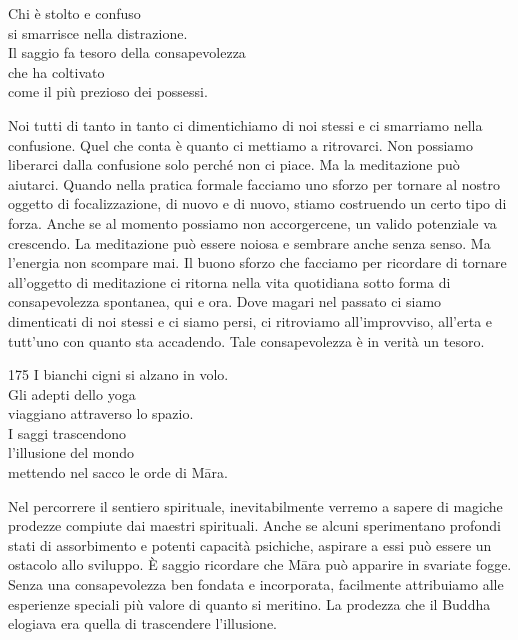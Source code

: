 
\begin{dhpVerse}{26}
\label{dhp-26}
Chi \`{e} stolto e confuso\\
si smarrisce nella distrazione.\\
Il saggio fa tesoro della consapevolezza\\
che ha coltivato\\
come il più prezioso dei possessi.
\end{dhpVerse}

\begin{dhpRefl}
Noi tutti di tanto in tanto ci dimentichiamo di noi stessi e ci smarriamo nella confusione. Quel che conta \`{e} quanto ci mettiamo a ritrovarci. Non possiamo liberarci dalla confusione solo perch\'{e} non ci piace. Ma la meditazione pu\`{o} aiutarci. Quando nella pratica formale facciamo uno sforzo per tornare al nostro oggetto di focalizzazione, di nuovo e di nuovo, stiamo costruendo un certo tipo di forza. Anche se al momento possiamo non accorgercene, un valido potenziale va crescendo. La meditazione pu\`{o} essere noiosa e sembrare anche senza senso. Ma l'energia non scompare mai. Il buono sforzo che facciamo per ricordare di tornare all'oggetto di meditazione ci ritorna nella vita quotidiana sotto forma di consapevolezza spontanea, qui e ora. Dove magari nel passato ci siamo dimenticati di noi stessi e ci siamo persi, ci ritroviamo all'improvviso, all'erta e tutt'uno con quanto sta accadendo. Tale consapevolezza \`{e} in verit\`{a} un tesoro.
\end{dhpRefl}


\begin{dhpVerse}{175}
\label{dhp-175}
I bianchi cigni si alzano in volo.\\
Gli adepti dello yoga\\
viaggiano attraverso lo spazio.\\
I saggi trascendono\\
l'illusione del mondo\\
mettendo nel sacco le orde di Māra.
\end{dhpVerse}

\begin{dhpRefl}
Nel percorrere il sentiero spirituale, inevitabilmente verremo a sapere di magiche prodezze compiute dai maestri spirituali. Anche se alcuni sperimentano profondi stati di assorbimento e potenti capacit\`{a} psichiche, aspirare a essi pu\`{o} essere un ostacolo allo sviluppo. \`{E} saggio ricordare che Māra pu\`{o} apparire in svariate fogge. Senza una consapevolezza ben fondata e incorporata, facilmente attribuiamo alle esperienze speciali più valore di quanto si meritino. La prodezza che il Buddha elogiava era quella di trascendere l'illusione.
\end{dhpRefl}

